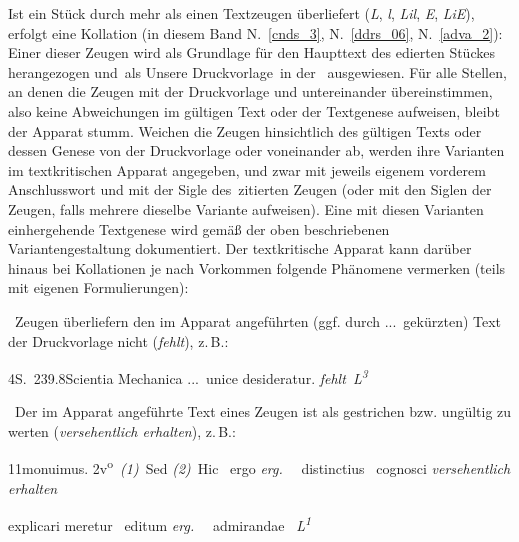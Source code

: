 Ist ein Stück durch mehr als einen Textzeugen überliefert (\textit{L}, \textit{l}, \textit{Lil}, \textit{E}, \textit{LiE}), erfolgt eine Kollation (in diesem Band N.~\ref{cnds_3}, N.~\ref{ddrs_06}, N.~\ref{adva_2}): Einer dieser Zeugen wird als Grundlage für den Haupttext des edierten Stückes herangezogen und als \glqq Unsere Druckvorlage\grqq\ in der  \grqq\ ausgewiesen. Für alle Stellen, an denen die Zeugen mit der Druckvorlage und untereinander übereinstimmen, also keine Abweichungen im gültigen Text oder der Textgenese aufweisen, bleibt der Apparat stumm. Weichen die Zeugen hinsichtlich des gültigen Texts oder dessen Genese von der Druckvorlage oder voneinander ab, werden ihre Varianten im textkritischen Apparat angegeben, und zwar mit jeweils eigenem vorderem Anschlusswort und mit der Sigle des zitierten Zeugen (oder mit den Siglen der Zeugen, falls mehrere dieselbe Variante aufweisen). Eine mit diesen Varianten einhergehende Textgenese wird gemäß der oben beschriebenen Variantengestaltung dokumentiert. Der textkritische Apparat kann darüber hinaus bei Kollationen je nach Vorkommen folgende Phänomene vermerken (teils mit eigenen Formulierungen):
\par
\vspace{6pt}
\noindent\textemdash\ Zeugen überliefern den im Apparat angeführten (ggf. durch \lbrack...\rbrack\ gekürzten) Text der Druckvorlage nicht (\textit{fehlt}), z.\,B.:\par %
{\footnotesize%
4\textendash S.~239.8\hspace{5mm}Scientia Mechanica \lbrack...\rbrack\ unice desideratur. \textit{fehlt~L\textsuperscript{3}}
}%
\par
\vspace{6pt}
\noindent\textemdash\ Der im Apparat angeführte Text eines Zeugen ist als gestrichen bzw. ungültig zu werten (\textit{versehentlich erhalten}), z.\,B.:\par%
{\footnotesize%
11\hspace{5mm}monuimus. \lbrack2v\textsuperscript{o}\rbrack\
\textit{(1)}~Sed
\textit{(2)}~Hic
\textbar~ergo \textit{erg.}~%
\textbar\ distinctius
\textbar~cognosci \textit{versehentlich erhalten}~\textbar\ }%
\par\vspace{-3pt}
{\footnotesize explicari meretur
\textbar~editum \textit{erg.}~%
\textbar\ admirandae%
~\textit{L\textsuperscript{1}}
}%
\par
